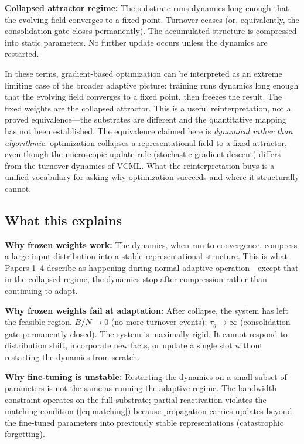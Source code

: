 \documentclass[12pt]{article}
\begin{document}
\textbf{Collapsed attractor regime:} The substrate runs dynamics long enough that the evolving field converges to a fixed point. Turnover ceases (or, equivalently, the consolidation gate closes permanently). The accumulated structure is compressed into static parameters. No further update occurs unless the dynamics are restarted.

In these terms, gradient-based optimization can be interpreted as an extreme limiting case of the broader adaptive picture: training runs dynamics long enough that the evolving field converges to a fixed point, then freezes the result. The fixed weights are the collapsed attractor. This is a useful reinterpretation, not a proved equivalence---the substrates are different and the quantitative mapping has not been established. The equivalence claimed here is \emph{dynamical rather than algorithmic}: optimization collapses a representational field to a fixed attractor, even though the microscopic update rule (stochastic gradient descent) differs from the turnover dynamics of VCML. What the reinterpretation buys is a unified vocabulary for asking why optimization succeeds and where it structurally cannot.

\subsection{What this explains}

\textbf{Why frozen weights work:} The dynamics, when run to convergence, compress a large input distribution into a stable representational structure. This is what Papers 1--4 describe as happening during normal adaptive operation---except that in the collapsed regime, the dynamics stop after compression rather than continuing to adapt.

\textbf{Why frozen weights fail at adaptation:} After collapse, the system has left the feasible region. $B/N \to 0$ (no more turnover events); $\tau_g \to \infty$ (consolidation gate permanently closed). The system is maximally rigid. It cannot respond to distribution shift, incorporate new facts, or update a single slot without restarting the dynamics from scratch.

\textbf{Why fine-tuning is unstable:} Restarting the dynamics on a small subset of parameters is not the same as running the adaptive regime. The bandwidth constraint operates on the full substrate; partial reactivation violates the matching condition (\ref{eq:matching}) because propagation carries updates beyond the fine-tuned parameters into previously stable representations (catastrophic forgetting).
\end{document}
